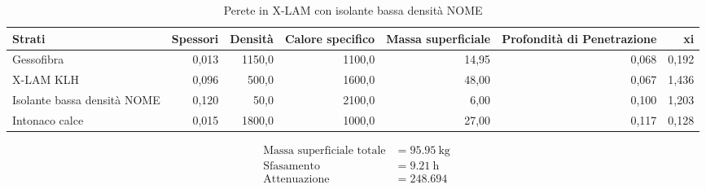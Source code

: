 \begin{table}
\centering
\caption{Perete in X-LAM con isolante bassa densità NOME}
\begin{tabular}{lrrrrrr}
\toprule
                      Strati & Spessori & Densità & Calore specifico & Massa superficiale & Profondità di Penetrazione &     xi \\
\midrule
                  Gessofibra &    0,013 &  1150,0 &           1100,0 &              14,95 &                      0,068 &  0,192 \\
                   X-LAM KLH &    0,096 &   500,0 &           1600,0 &              48,00 &                      0,067 &  1,436 \\
 Isolante bassa densità NOME &    0,120 &    50,0 &           2100,0 &               6,00 &                      0,100 &  1,203 \\
              Intonaco calce &    0,015 &  1800,0 &           1000,0 &              27,00 &                      0,117 &  0,128 \\
\bottomrule
\end{tabular}
\end{table}

\begin{flushleft}
\begin{align*}
\text{Massa superficiale totale} &= \SI{95.95}{\kilo\gram}\\
\text{Sfasamento} &= \SI{9.21}{\hour}\\
\text{Attenuazione} &= \SI{248.694}{}
\end{align*}
\end{flushleft}

